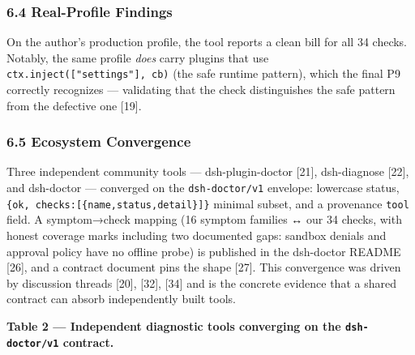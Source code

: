 \documentclass[
]{article}
\begin{document}
\subsubsection{6.4 Real-Profile Findings}\label{real-profile-findings}

On the author's production profile, the tool reports a clean bill for
all 34 checks. Notably, the same profile \emph{does} carry plugins that
use \texttt{ctx.inject({[}"settings"{]},\ cb)} (the safe runtime
pattern), which the final P9 correctly recognizes --- validating that
the check distinguishes the safe pattern from the defective one
{[}19{]}.

\subsubsection{6.5 Ecosystem Convergence}\label{ecosystem-convergence}

Three independent community tools --- dsh-plugin-doctor {[}21{]},
dsh-diagnose {[}22{]}, and dsh-doctor --- converged on the
\texttt{dsh-doctor/v1} envelope: lowercase status,
\texttt{\{ok,\ checks:{[}\{name,status,detail\}{]}\}} minimal subset,
and a provenance \texttt{tool} field. A symptom→check mapping (16
symptom families ↔ our 34 checks, with honest coverage marks including
two documented gaps: sandbox denials and approval policy have no offline
probe) is published in the dsh-doctor README {[}26{]}, and a contract
document pins the shape {[}27{]}. This convergence was driven by
discussion threads {[}20{]}, {[}32{]}, {[}34{]} and is the concrete
evidence that a shared contract can absorb independently built tools.

\textbf{Table 2 --- Independent diagnostic tools converging on the
\texttt{dsh-doctor/v1} contract.}

\begin{table}[H]
\centering
\caption{Independent diagnostic tools converging on the \texttt{dsh-doctor/v1} contract.}
\label{tab:tools}
\end{table}
\end{document}
